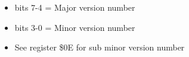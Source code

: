 \begin{itemize}
\item bits 7-4 = Major version number
\item bits 3-0 = Minor version number
\item[] See register \$0E for sub minor version number
\end{itemize}

